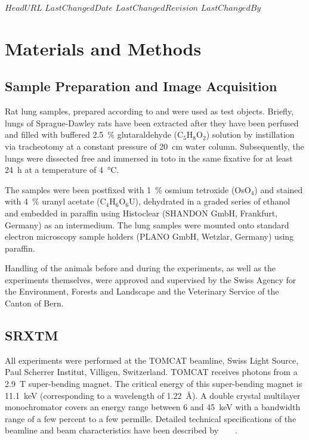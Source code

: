 \svnidlong
{$HeadURL$}
{$LastChangedDate$}
{$LastChangedRevision$}
{$LastChangedBy$}

\ifhtml
\else
\begin{center}
\end{center}
\fi

\section{Materials and Methods}%
\label{sec:materials and methods}%
\subsection{Sample Preparation and Image Acquisition}%
Rat lung samples, prepared according to %
\ifhtml
	\citet{Tschanz2002,Schittny1997}
\else
	 and 
\fi%
were used as test objects. Briefly, lungs of Sprague-Dawley rats have been extracted after they have been perfused and filled with buffered \SI{2.5}{\percent} glutaraldehyde (C$_5$H$_8$O$_2$) solution by instillation via tracheotomy at a constant pressure of \SI{20}{\centi\meter} water column. Subsequently, the lungs were dissected free and immersed in toto in the same fixative for at least \SI{24}{\hour} at a temperature of \SI{4}{\celsius}.

The samples were been postfixed with \SI{1}{\percent} osmium tetroxide (OsO$_4$) and stained with \SI{4}{\percent} uranyl acetate (C$_4$H$_6$O$_6$U), dehydrated in a graded series of ethanol and embedded in paraffin using Histoclear (SHANDON GmbH, Frankfurt, Germany) as an intermedium. The lung samples were mounted onto standard electron microscopy sample holders (PLANO GmbH, Wetzlar, Germany) using paraffin.

Handling of the animals before and during the experiments, as well as the experiments themselves, were approved and supervised by the Swiss Agency for the Environment, Forests and Landscape and the Veterinary Service of the Canton of Bern.

\subsection{SRXTM}%
All experiments were performed at the TOMCAT beamline, Swiss Light Source, Paul Scherrer Institut, Villigen, Switzerland. TOMCAT receives photons from a \SI{2.9}{\tesla} super-bending magnet. The critical energy of this super-bending magnet is \SI{11.1}{\kilo\electronvolt} (corresponding to a wavelength of \SI{1.22}{\angstrom}). A double crystal multilayer monochromator covers an energy range between 6 and \SI{45}{\kilo\electronvolt} with a bandwidth range of a few percent to a few permille. Detailed technical specifications of the beamline and beam characteristics have been described by%
\ifhtml
	~\citet{Stampanoni2006a}
\else
	~
\fi%
.

